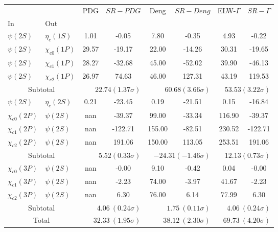 \begin{tabular}{|l|l|c|c|c|c|c|c|}%
\hline%
&&PDG&$SR-PDG$&Deng&$SR-Deng$&ELW-$\Gamma$&$SR-\Gamma$\\%
In&Out&&&&&&\\%
\hline%
$\psi(2S)$&$\eta_{c}(1S)$&1.01&-0.05&7.80&-0.35&4.93&-0.22\\%
$\psi(2S)$&$\chi_{c0}(1P)$&29.57&-19.17&22.00&-14.26&30.31&-19.65\\%
$\psi(2S)$&$\chi_{c1}(1P)$&28.27&-32.68&45.00&-52.02&39.90&-46.13\\%
$\psi(2S)$&$\chi_{c2}(1P)$&26.97&74.63&46.00&127.31&43.19&119.53\\%
\hline%
\hline%
\multicolumn{2}{|c|}{Subtotal}&\multicolumn{2}{|r|}{$22.74 (1.37\sigma)$}&\multicolumn{2}{|r|}{$60.68 (3.66\sigma)$}&\multicolumn{2}{|r|}{$53.53 (3.22\sigma)$}\\%
\hline%
\hline%
$\psi(2S)$&$\eta_{c}(2S)$&0.21&-23.45&0.19&-21.51&0.15&-16.84\\%
$\chi_{c0}(2P)$&$\psi(2S)$&nan&-39.37&99.00&-33.34&116.90&-39.37\\%
$\chi_{c1}(2P)$&$\psi(2S)$&nan&-122.71&155.00&-82.51&230.52&-122.71\\%
$\chi_{c2}(2P)$&$\psi(2S)$&nan&191.06&150.00&113.05&253.51&191.06\\%
\hline%
\hline%
\multicolumn{2}{|c|}{Subtotal}&\multicolumn{2}{|r|}{$5.52 (0.33\sigma)$}&\multicolumn{2}{|r|}{$-24.31 (-1.46\sigma)$}&\multicolumn{2}{|r|}{$12.13 (0.73\sigma)$}\\%
\hline%
\hline%
$\chi_{c0}(3P)$&$\psi(2S)$&nan&-0.00&9.10&-0.42&0.04&-0.00\\%
$\chi_{c1}(3P)$&$\psi(2S)$&nan&-2.23&74.00&-3.97&41.67&-2.23\\%
$\chi_{c2}(3P)$&$\psi(2S)$&nan&6.30&76.00&6.14&77.99&6.30\\%
\hline%
\hline%
\multicolumn{2}{|c|}{Subtotal}&\multicolumn{2}{|r|}{$4.06~(0.24\sigma)$}&\multicolumn{2}{|r|}{$1.75~(0.11\sigma)$}&\multicolumn{2}{|r|}{$4.06~(0.24\sigma)$}\\%
\hline%
\hline%
\multicolumn{2}{|c|}{Total}&\multicolumn{2}{|r|}{$32.33~(1.95\sigma)$}&\multicolumn{2}{|r|}{$38.12~(2.30\sigma)$}&\multicolumn{2}{|r|}{$69.73~(4.20\sigma)$}\\%
\hline%
\end{tabular}